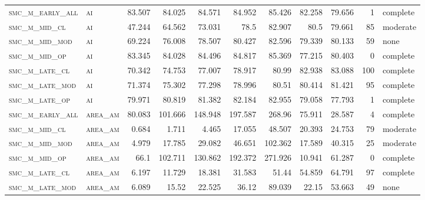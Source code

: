 \begin{landscape}
\begin{center}
\begin{footnotesize}
\begin{longtable}{llrrrrr|rrr}
\textsc{smc\_m\_early\_all} & \textsc{ai        }   & 83.507   & 84.025   & 84.571   & 84.952   & 85.426   & 82.258      & 79.656        & 1             & complete \\
\textsc{smc\_m\_mid\_cl   } & \textsc{ai        }   & 47.244   & 64.562   & 73.031   & 78.5     & 82.907   & 80.5        & 79.661        & 85            & moderate \\
\textsc{smc\_m\_mid\_mod  } & \textsc{ai        }   & 69.224   & 76.008   & 78.507   & 80.427   & 82.596   & 79.339      & 80.133        & 59            & none \\
\textsc{smc\_m\_mid\_op   } & \textsc{ai        }   & 83.345   & 84.028   & 84.496   & 84.817   & 85.369   & 77.215      & 80.403        & 0             & complete     \\
\textsc{smc\_m\_late\_cl  } & \textsc{ai        }   & 70.342   & 74.753   & 77.007   & 78.917   & 80.99    & 82.938      & 83.088        & 100           & complete \\
\textsc{smc\_m\_late\_mod } & \textsc{ai        }   & 71.374   & 75.302   & 77.298   & 78.996   & 80.51    & 80.414      & 81.421        & 95            & complete \\
\textsc{smc\_m\_late\_op  } & \textsc{ai        }   & 79.971   & 80.819   & 81.382   & 82.184   & 82.955   & 79.058      & 77.793        & 1             & complete \\
\textsc{smc\_m\_early\_all} & \textsc{area\_am  }   & 80.083   & 101.666  & 148.948  & 197.587  & 268.96   & 75.911      & 28.587        & 4             & complete \\
\textsc{smc\_m\_mid\_cl   } & \textsc{area\_am  }   & 0.684    & 1.711    & 4.465    & 17.055   & 48.507   & 20.393      & 24.753        & 79            & moderate \\
\textsc{smc\_m\_mid\_mod  } & \textsc{area\_am  }   & 4.979    & 17.785   & 29.082   & 46.651   & 102.362  & 17.589      & 40.315        & 25            & moderate \\
\textsc{smc\_m\_mid\_op   } & \textsc{area\_am  }   & 66.1     & 102.711  & 130.862  & 192.372  & 271.926  & 10.941      & 61.287        & 0             & complete     \\
\textsc{smc\_m\_late\_cl  } & \textsc{area\_am  }   & 6.197    & 11.729   & 18.381   & 31.583   & 51.44    & 54.859      & 64.791        & 97            & complete \\
\textsc{smc\_m\_late\_mod } & \textsc{area\_am  }   & 6.089    & 15.52    & 22.525   & 36.12    & 89.039   & 22.15       & 53.663        & 49            & none \\

\end{longtable}
\end{footnotesize}
\end{center}
\end{landscape}
